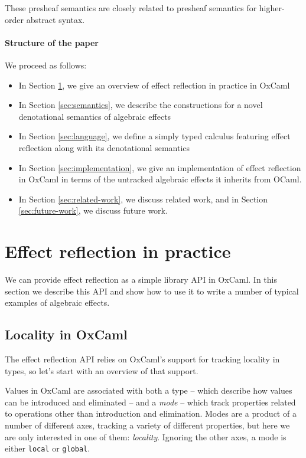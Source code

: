\documentclass[acmsmall, screen, nonacm]{acmart}
\theoremstyle{definition}
\begin{document}
These presheaf semantics are closely related to presheaf semantics for
higher-order abstract syntax\cite{??}.

\paragraph{Structure of the paper} We proceed as follows:
\begin{itemize}
\item In Section \ref{sec:pracice}, we give an overview of effect reflection in
  practice in OxCaml
\item In Section \ref{sec:semantics}, we describe the constructions for a
  novel denotational semantics of algebraic effects
\item In Section \ref{sec:language}, we define a simply typed calculus featuring
  effect reflection along with its denotational semantics
\item In Section \ref{sec:implementation}, we give an implementation of effect
  reflection in OxCaml in terms of the untracked algebraic effects it
  inherits from OCaml.
\item In Section \ref{sec:related-work}, we discuss related work, and in
  Section \ref{sec:future-work}, we discuss future work.
\end{itemize}

\section{Effect reflection in practice}
\label{sec:pracice}

We can provide effect reflection as a simple library API in OxCaml. In
this section we describe this API and show how to use it to write a
number of typical examples of algebraic effects.

\subsection{Locality in OxCaml}

The effect reflection API relies on OxCaml's support for tracking
locality in types, so let's start with an overview of that support.

Values in OxCaml are associated with both a type -- which describe how
values can be introduced and eliminated -- and a \emph{mode} -- which
track properties related to operations other than introduction and
elimination. Modes are a product of a number of different axes, tracking
a variety of different properties, but here we are only interested in
one of them: \emph{locality}. Ignoring the other axes, a mode is either
\lstinline[style=oxcaml]{local} or \lstinline[style=oxcaml]{global}.
\end{document}
